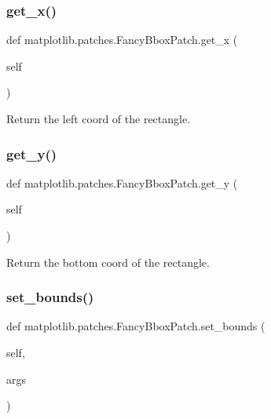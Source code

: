 \subsubsection{\texorpdfstring{get\+\_\+x()}{get\_x()}}
{\footnotesize\ttfamily def matplotlib.\+patches.\+Fancy\+Bbox\+Patch.\+get\+\_\+x (\begin{DoxyParamCaption}\item[{}]{self }\end{DoxyParamCaption})}

\begin{DoxyVerb}Return the left coord of the rectangle.\end{DoxyVerb}
 \mbox{\label{classmatplotlib_1_1patches_1_1FancyBboxPatch_ad75e9464d0e74678f06ab84de2c1dfb4}} 
\subsubsection{\texorpdfstring{get\+\_\+y()}{get\_y()}}
{\footnotesize\ttfamily def matplotlib.\+patches.\+Fancy\+Bbox\+Patch.\+get\+\_\+y (\begin{DoxyParamCaption}\item[{}]{self }\end{DoxyParamCaption})}

\begin{DoxyVerb}Return the bottom coord of the rectangle.\end{DoxyVerb}
 \mbox{\label{classmatplotlib_1_1patches_1_1FancyBboxPatch_af33f956f6302111810c2a70cd3c56f0b}} 
\subsubsection{\texorpdfstring{set\+\_\+bounds()}{set\_bounds()}}
{\footnotesize\ttfamily def matplotlib.\+patches.\+Fancy\+Bbox\+Patch.\+set\+\_\+bounds (\begin{DoxyParamCaption}\item[{}]{self,  }\item[{}]{args }\end{DoxyParamCaption})}

